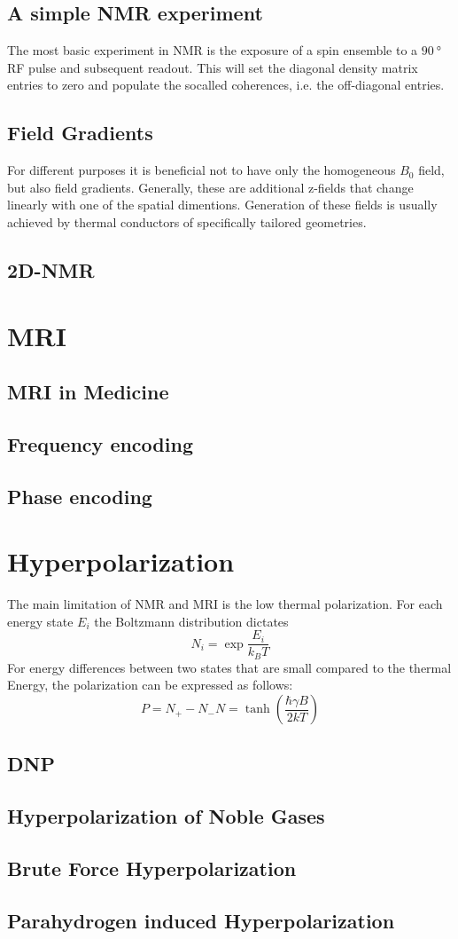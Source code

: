 		\subsection{A simple NMR experiment}
		The most basic experiment in NMR is the exposure of a spin ensemble to a $\SI{90}{\degree}$
		RF pulse and subsequent readout. This will set the diagonal density matrix entries to zero
		and populate the socalled coherences, i.e. the off-diagonal entries.
		\subsection{Field Gradients}
		For different purposes it is beneficial not to have only the homogeneous $B_0$ field, but
		also field gradients. Generally, these are additional z-fields that change linearly with one
		of the spatial dimentions. Generation of these fields is usually achieved by thermal
		conductors of specifically tailored geometries.
		\subsection{2D-NMR}
	\section{MRI}
		\subsection{MRI in Medicine}
		\subsection{Frequency encoding}
		\subsection{Phase encoding}
	\section{Hyperpolarization}
		The main limitation of NMR and MRI is the low thermal polarization.
		For each energy state $E_i$ the Boltzmann distribution dictates
		\begin{equation}
			N_i = \exp{\frac{E_i}{k_B T}}
		\end{equation}
		For energy differences between two states that are small compared to
		the thermal Energy, the polarization can be expressed as follows:
		\begin{equation}
			P = {N_+-N_-}{N} = \tanh\left(\frac{\hbar \gamma B}{2 k T }\right)
		\end{equation}
		\subsection{DNP}
		\subsection{Hyperpolarization of Noble Gases}
		\subsection{Brute Force Hyperpolarization}
		\subsection{Parahydrogen induced Hyperpolarization}
